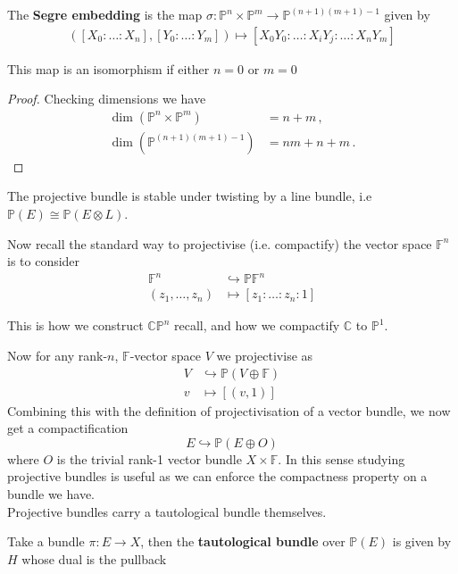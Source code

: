 \documentclass{article}
\begin{document}
\begin{definition}
	The \textbf{Segre embedding} is the map $\sigma:\mathbb{P}^n \times \mathbb{P}^m \to \mathbb{P}^{(n+1)(m+1)-1}$ given by
	\begin{align*}
		([X_0:\dots: X_n],[Y_0: \dots :Y_m]) \mapsto [X_0Y_0: \dots :X_iY_j:\dots :X_n Y_m]
	\end{align*}
\end{definition}
\begin{prop}
	This map is an isomorphism if either $n=0$ or $m=0$
\end{prop}
\begin{proof}
	Checking dimensions we have 
	\begin{align*}
		\dim(\mathbb{P}^n \times \mathbb{P}^m) &= n+m \, , \\
		\dim(\mathbb{P}^{(n+1)(m+1)-1}) &= nm+n+m \, .
	\end{align*}
\end{proof}
\begin{corollary}
	The projective bundle is stable under twisting by a line bundle, i.e $\mathbb{P}(E) \cong \mathbb{P}(E \otimes L)$. 
\end{corollary}

Now recall the standard way to projectivise (i.e. compactify) the vector space $\mathbb{F}^n$ is to consider
\begin{align*}
	\mathbb{F}^n &\hookrightarrow \mathbb{PF}^n \\
	(z_1, \dots, z_n) &\mapsto [z_1 : \dots : z_n : 1] 
\end{align*}
\begin{example}
	This is how we construct $\mathbb{CP}^n$ recall, and how we compactify $\mathbb{C}$ to $\mathbb{P}^1$. 
\end{example}
Now for any rank-$n$, $\mathbb{F}$-vector space $V$ we projectivise as 
\begin{align*}
	V &\hookrightarrow \mathbb{P}(V \oplus \mathbb{F}) \\
	v &\mapsto [(v,1)]
\end{align*}
Combining this with the definition of projectivisation of a vector bundle, we now get a compactification 
\[
E \hookrightarrow \mathbb{P}(E \oplus O) 
\]
where $O$ is the trivial rank-1 vector bundle $X \times \mathbb{F}$. In this sense studying projective bundles is useful as we can enforce the compactness property on a bundle we have. \\
Projective bundles carry a tautological bundle themselves.
\begin{definition}
	Take a bundle $\pi:E \to X$, then the \textbf{tautological bundle} over $\mathbb{P}(E)$ is given by $H$ whose dual is the pullback 
	\begin{center}
	\end{center}
\end{definition}
\end{document}
